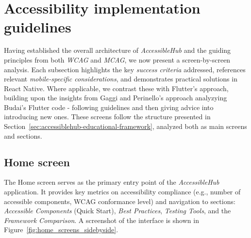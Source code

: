 \section{Accessibility implementation guidelines}
\label{sec:implementation-guidelines}

Having established the overall architecture of \textit{AccessibleHub} and the guiding principles from both \textit{WCAG} and \textit{MCAG}, we now present a screen-by-screen analysis. Each subsection highlights the key \textit{success criteria} addressed, references relevant \textit{mobile-specific considerations}, and demonstrates practical solutions in React Native. Where applicable, we contrast these with Flutter's approach, building upon the insights from Gaggi and Perinello's approach \cite{budai2024mobile} analyzying Budai's Flutter code - following guidelines and then giving advice into introducing new ones. These screens follow the structure presented in Section~\ref{sec:accessiblehub-educational-framework}, analyzed both as main screens and sections.

\subsection{Home screen}

The Home screen serves as the primary entry point of the \textit{AccessibleHub} application. It provides key metrics on accessibility compliance (e.g., number of accessible components, WCAG conformance level) and navigation to sections: \textit{Accessible Components} (Quick Start), \textit{Best Practices}, \textit{Testing Tools}, and the \textit{Framework Comparison}. A screenshot of the interface is shown in Figure~\ref{fig:home_screens_sidebyside}.

